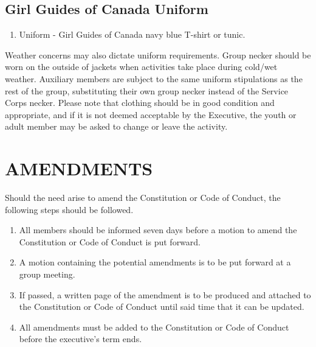 \documentclass{Service_Corps_Document}
\begin{document}
    \subsection{Girl Guides of Canada Uniform}\label{subsec:girl-guides-of-canada-uniform}
    \begin{enumerate}
        \item Uniform - Girl Guides of Canada navy blue T-shirt or tunic.
    \end{enumerate}
    Weather concerns may also dictate uniform requirements.
    Group necker should be worn on the outside of jackets when activities take place during cold/wet weather.
    Auxiliary members are subject to the same uniform stipulations as the rest of the group, substituting their own group necker instead of the Service Corps necker.
    Please note that clothing should be in good condition and appropriate, and if it is not deemed acceptable by the Executive, the youth or adult member may be asked to change or leave the activity.


    \section{AMENDMENTS}\label{sec:amendments}
    Should the need arise to amend the Constitution or Code of Conduct, the following steps should be followed.
    \begin{enumerate}
        \item All members should be informed seven days before a motion to amend the Constitution or Code of Conduct is put forward.
        \item A motion containing the potential amendments is to be put forward at a group meeting.
        \item If passed, a written page of the amendment is to be produced and attached to the Constitution or Code of Conduct until said time that it can be updated.
        \item All amendments must be added to the Constitution or Code of Conduct before the executive's term ends.
    \end{enumerate}
\end{document}

